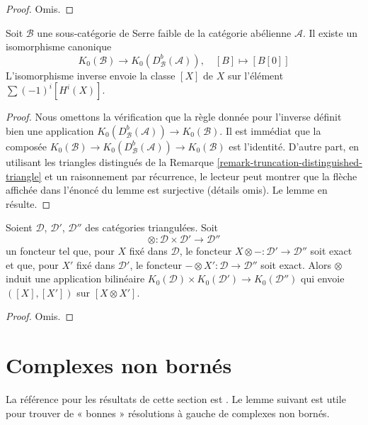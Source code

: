 \begin{proof}
Omis.
\end{proof}

\begin{lemma}
\label{lemma-DBA-map-K}
Soit $\mathcal{B}$ une sous-catégorie de Serre faible de la catégorie
abélienne $\mathcal{A}$. Il existe un isomorphisme canonique
$$
K_0(\mathcal{B}) \longrightarrow
K_0(D^b_\mathcal{B}(\mathcal{A})),\quad
[B] \longmapsto [B[0]]
$$
L'isomorphisme inverse envoie la classe $[X]$ de $X$ sur l'élément
$\sum (-1)^i[H^i(X)]$.
\end{lemma}

\begin{proof}
Nous omettons la vérification que la règle donnée pour l'inverse définit bien
une application $K_0(D^b_\mathcal{B}(\mathcal{A})) \to K_0(\mathcal{B})$.
Il est immédiat que la composée
$K_0(\mathcal{B}) \to
K_0(D^b_\mathcal{B}(\mathcal{A})) \to
K_0(\mathcal{B})$ est l'identité. D'autre part, en utilisant les triangles
distingués de la Remarque \ref{remark-truncation-distinguished-triangle} et un
raisonnement par récurrence, le lecteur peut montrer que la flèche affichée
dans l'énoncé du lemme est surjective (détails omis). Le lemme en résulte.
\end{proof}

\begin{lemma}
\label{lemma-bilinear-map-K}
Soient $\mathcal{D}$, $\mathcal{D}'$, $\mathcal{D}''$ des catégories
triangulées. Soit
$$
\otimes : \mathcal{D} \times \mathcal{D}' \longrightarrow \mathcal{D}''
$$
un foncteur tel que, pour $X$ fixé dans $\mathcal{D}$, le foncteur
$X \otimes - : \mathcal{D}' \to \mathcal{D}''$ soit exact et que, pour $X'$
fixé dans $\mathcal{D}'$, le foncteur
$- \otimes X' : \mathcal{D} \to \mathcal{D}''$ soit exact. Alors
$\otimes$ induit une application bilinéaire
$K_0(\mathcal{D}) \times K_0(\mathcal{D}') \to K_0(\mathcal{D}'')$
qui envoie $([X], [X'])$ sur $[X \otimes X']$.
\end{lemma}

\begin{proof}
Omis.
\end{proof}

\section{Complexes non bornés}
\label{section-unbounded}

\noindent
La référence pour les résultats de cette section est \cite{Spaltenstein}.
Le lemme suivant est utile pour trouver de « bonnes » résolutions à gauche
de complexes non bornés.

